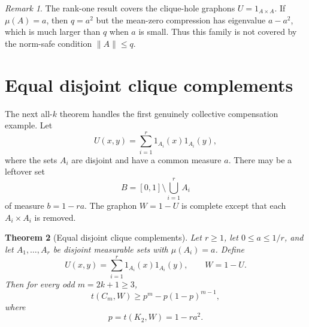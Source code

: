 \documentclass[11pt]{article}
\newtheorem{theorem}{Theorem}[section]
\theoremstyle{definition}
\theoremstyle{remark}
\newtheorem{remark}[theorem]{Remark}
\newcommand{\0}{\mathbf 0}
\begin{document}
\begin{remark}
The rank-one result covers the clique-hole graphons $U=1_{A\times A}$.  If $\mu(A)=a$, then $q=a^2$ but the mean-zero compression has eigenvalue $a-a^2$, which is much larger than $q$ when $a$ is small.  Thus this family is not covered by the norm-safe condition $\|A\|\le q$.
\end{remark}

\section{Equal disjoint clique complements}

The next all-$k$ theorem handles the first genuinely collective compensation example.  Let
\[
        U(x,y)=\sum_{i=1}^r 1_{A_i}(x)1_{A_i}(y),
\]
where the sets $A_i$ are disjoint and have a common measure $a$.  There may be a leftover set
\[
        B=[0,1]\setminus\bigcup_{i=1}^r A_i
\]
of measure $b=1-ra$.  The graphon $W=1-U$ is complete except that each $A_i\times A_i$ is removed.

\begin{theorem}[Equal disjoint clique complements]\label{thm:equal-clique-complements}
Let $r\ge1$, let $0\le a\le1/r$, and let $A_1,\ldots,A_r$ be disjoint measurable sets with $\mu(A_i)=a$.  Define
\[
        U(x,y)=\sum_{i=1}^r1_{A_i}(x)1_{A_i}(y),
        \qquad
        W=1-U.
\]
Then for every odd $m=2k+1\ge3$,
\[
        t(C_m,W)\ge p^m-p(1-p)^{m-1},
\]
where
\[
        p=t(K_2,W)=1-ra^2.
\]
\end{theorem}
\end{document}
